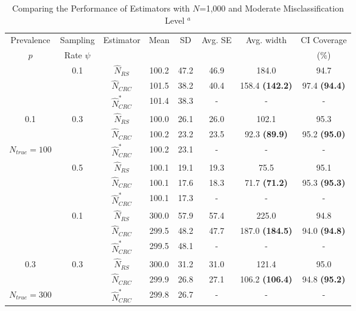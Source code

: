\documentclass[useAMS,usenatbib,referee]{biom}
\begin{document}
\begin{table}
    \centering
    \caption{Comparing the Performance of Estimators with $N$=1,000 and Moderate Misclassification Level $^a$  }   \label{table_3}
    \begin{threeparttable}[b]
    \begin{tabular}{|c|c|c|c|c|c|c|c|}
    \hline
    Prevalence & 
    Sampling &  \multirow{2}{*}{Estimator \tnote{b}} & \multirow{2}{*}{Mean} & \multirow{2}{*}{SD} & \multirow{2}{*}{Avg. SE} & \multirow{2}{*}{Avg. width \tnote{c}} & CI Coverage  \\
    $p$ & Rate $\psi$ & &&&&& (\%)  \\ \hline
     & \multirow{3}{*}{0.1} & $\hat{N}_{RS}$ & 100.2 & 47.2 & 46.9 & 184.0 & 94.7   \\ \cline{3-8}
     & ~ & $\hat{N}_{CRC}$ & 101.5 & 38.2 & 40.4 & 158.4 \textbf{(142.2)} & 97.4 \textbf{(94.4)}  \\ \cline{3-8}
     & ~ & $\hat{N}_{CRC}^*$ & 101.4 & 38.3  & - & - & -   \\ \cline{2-8}
    
    0.1 & \multirow{3}{*}{0.3}  & $\hat{N}_{RS}$ & 100.0 & 26.1 & 26.0 & 102.1 & 95.3   \\ \cline{3-8}
     & ~ & $\hat{N}_{CRC}$ & 100.2 & 23.2 & 23.5 & 92.3 \textbf{(89.9)} & 95.2 \textbf{(95.0)}  \\ \cline{3-8}
    $N_{true}=100$ & ~ & $\hat{N}_{CRC}^*$ & 100.2 & 23.1 & - & - & -   \\  \cline{2-8}
    
     & \multirow{3}{*}{0.5}  & $\hat{N}_{RS}$ & 100.1 & 19.1 & 19.3 & 75.5 & 95.1   \\ \cline{3-8}
     & ~ & $\hat{N}_{CRC}$ & 100.1 & 17.6 & 18.3 & 71.7 \textbf{(71.2)} & 95.3 \textbf{(95.3)}   \\ \cline{3-8}
    ~ & ~ & $\hat{N}_{CRC}^*$ & 100.1 & 17.3 & - & - & -   \\ \hline
    
    & \multirow{3}{*}{0.1} & $\hat{N}_{RS}$ & 300.0 & 57.9 & 57.4 & 225.0 & 94.8  \\ \cline{3-8}
     & ~ & $\hat{N}_{CRC}$ &   299.5 & 48.2 & 47.7 & 187.0 \textbf{(184.5)} & 94.0 \textbf{(94.8)}  \\ \cline{3-8}
    ~ & ~ & $\hat{N}_{CRC}^*$ & 299.5 & 48.1 & - & - & -   \\ \cline{2-8}
    
    0.3 & \multirow{3}{*}{0.3}  & $\hat{N}_{RS}$ & 300.0 & 31.2 & 31.0 & 121.4 & 95.0  \\ \cline{3-8}
     & ~ & $\hat{N}_{CRC}$ & 299.9 & 26.8 & 27.1 & 106.2 \textbf{(106.4)} & 94.8 \textbf{(95.2)}   \\ \cline{3-8}
     $N_{true}=300$ & ~ & $\hat{N}_{CRC}^*$ &  299.8 & 26.7 & - & - & -   \\ \cline{2-8}
    

\end{tabular}
\end{threeparttable}
\end{table}
\end{document}
